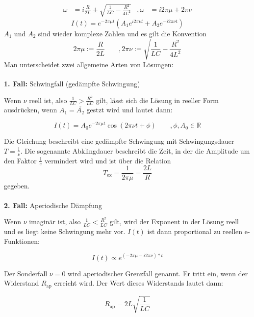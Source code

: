 \begin{align*}
    \omega &= i \frac{R}{2L} \pm \sqrt{\frac{1}{LC}- \frac{R^2}{4L^2}} & ,\omega &= i2 \pi \mu \pm 2\pi \nu
\end{align*}
\begin{equation}
    \label{eqn:RLC_lsg}
    I(t) = e^{-2 \pi \mu t} (A_1e^{i2 \pi \nu t} + A_2e^{-i2 \pi \nu t})
\end{equation}
$A_1$ und $A_2$ sind wieder komplexe Zahlen und es gilt die Konvention 
\begin{equation*}
    2\pi \mu := \frac{R}{2L} \qquad , 2\pi \nu := \sqrt{\frac{1}{LC}- \frac{R^2}{4L^2}}
\end{equation*}
Man unterscheidet zwei allgemeine Arten von Lösungen:\\
\\
\textbf{1. Fall:} Schwingfall (gedämpfte Schwingung)

Wenn $\nu$ reell ist, also $\frac{1}{LC} > \frac{R^2}{LC}$ gilt, lässt sich die Lösung 
in reeller Form ausdrücken, wenn $A_1 = \overline{A_2}$ gestzt wird und lautet dann:

\begin{equation}
    I(t) = A_0e^{-2\pi \mu t}\cos(2\pi \nu t + \phi) \qquad , \phi, A_0 \in \mathbb{R}
\end{equation}

Die Gleichung beschreibt eine gedämpfte Schwingung mit Schwingungsdauer $T = \frac{1}{\nu}$.
Die sogenannte Abklingdauer beschreibt die Zeit, in der die Amplitude um den Faktor $\frac{1}{e}$ vermindert
wird und ist über die Relation 
\begin{equation}
    \label{eqn:T_ex}
    T_\text{ex} = \frac{1}{2\pi\mu} = \frac{2L}{R}
\end{equation}
gegeben. \\
\\
\textbf{2. Fall:} Aperiodische Dämpfung

Wenn $\nu$ imaginär ist, also $\frac{1}{LC} < \frac{R^2}{LC}$ gilt, wird der Exponent in der Lösung reell
und es liegt keine Schwingung mehr vor. $I(t)$ ist dann proportional zu reellen e-Funktionen:

\begin{equation}
    I(t) \propto e^{(-2\pi\mu-i2\pi\nu)*t}
\end{equation}

Der Sonderfall $\nu = 0$ wird aperiodischer Grenzfall genannt. Er tritt ein, wenn der Widerstand $R_\text{ap}$
erreicht wird. Der Wert dieses Widerstands lautet dann:

\begin{equation}
    \label{eqn:R_ap}
    R_\text{ap} =2L \sqrt{\frac{1}{LC}}
\end{equation}
